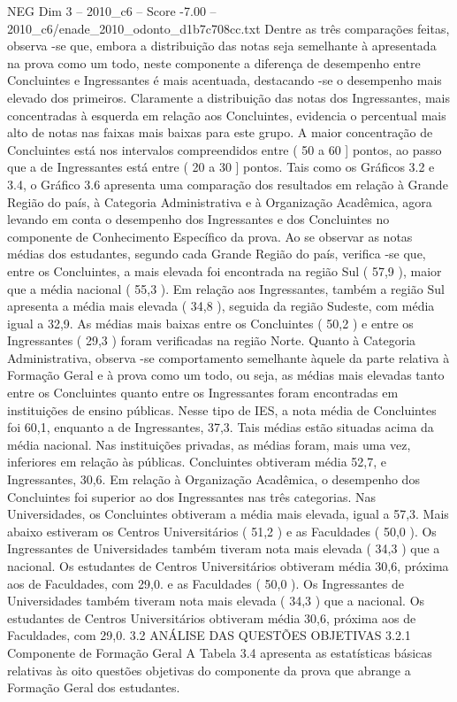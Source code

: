 \begin{textsample}{NEG Dim 3 – 2010\_c6 – Score -7.00 – 2010\_c6/enade\_2010\_odonto\_d1b7c708cc.txt}
Dentre as três comparações feitas, observa -se que, embora a distribuição das notas seja semelhante à apresentada na prova como um todo, neste componente a diferença de desempenho entre Concluintes e Ingressantes é mais acentuada, destacando -se o desempenho mais elevado dos primeiros.
Claramente a distribuição das notas dos Ingressantes, mais concentradas à esquerda em relação aos Concluintes, evidencia o percentual mais alto de notas nas faixas mais baixas para este grupo.
A maior concentração de Concluintes está nos intervalos compreendidos entre ( 50 a 60 ] pontos, ao passo que a de Ingressantes está entre ( 20 a 30 ] pontos.
Tais como os Gráficos 3.2 e 3.4, o Gráfico 3.6 apresenta uma comparação dos resultados em relação à Grande Região do país, à Categoria Administrativa e à Organização Acadêmica, agora levando em conta o desempenho dos Ingressantes e dos Concluintes no componente de Conhecimento Específico da prova.
Ao se observar as notas médias dos estudantes, segundo cada Grande Região do país, verifica -se que, entre os Concluintes, a mais elevada foi encontrada na região Sul ( 57,9 ), maior que a média nacional ( 55,3 ).
Em relação aos Ingressantes, também a região Sul apresenta a média mais elevada ( 34,8 ), seguida da região Sudeste, com média igual a 32,9.
As médias mais baixas entre os Concluintes ( 50,2 ) e entre os Ingressantes ( 29,3 ) foram verificadas na região Norte.
Quanto à Categoria Administrativa, observa -se comportamento semelhante àquele da parte relativa à Formação Geral e à prova como um todo, ou seja, as médias mais elevadas tanto entre os Concluintes quanto entre os Ingressantes foram encontradas em instituições de ensino públicas.
Nesse tipo de IES, a nota média de Concluintes foi 60,1, enquanto a de Ingressantes, 37,3.
Tais médias estão situadas acima da média nacional.
Nas instituições privadas, as médias foram, mais uma vez, inferiores em relação às públicas.
Concluintes obtiveram média 52,7, e Ingressantes, 30,6.
Em relação à Organização Acadêmica, o desempenho dos Concluintes foi superior ao dos Ingressantes nas três categorias.
Nas Universidades, os Concluintes obtiveram a média mais elevada, igual a 57,3.
Mais abaixo estiveram os Centros Universitários ( 51,2 ) e as Faculdades ( 50,0 ).
Os Ingressantes de Universidades também tiveram nota mais elevada ( 34,3 ) que a nacional.
Os estudantes de Centros Universitários obtiveram média 30,6, próxima aos de Faculdades, com 29,0. e as Faculdades ( 50,0 ).
Os Ingressantes de Universidades também tiveram nota mais elevada ( 34,3 ) que a nacional.
Os estudantes de Centros Universitários obtiveram média 30,6, próxima aos de Faculdades, com 29,0. 3.2 ANÁLISE DAS QUESTÕES OBJETIVAS 3.2.1 Componente de Formação Geral A Tabela 3.4 apresenta as estatísticas básicas relativas às oito questões objetivas do componente da prova que abrange a Formação Geral dos estudantes.

\end{textsample}
